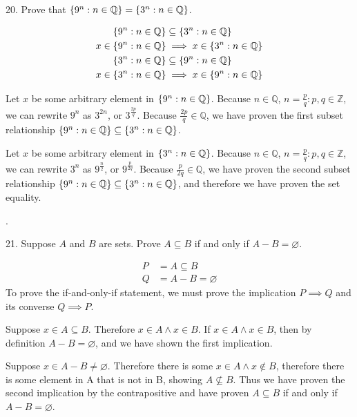 \documentclass{idrisMemo}
\begin{document}
\begin{prooflist}{20. Prove that $\{9^n: n \in \mathbb{Q}\}=\{3^n: n \in
    \mathbb{Q}\}$.}
\item
\begin{align*}
    \{9^n: n \in \mathbb{Q}\} &\subseteq\{3^n: n \in \mathbb{Q}\}\\
    x\in \{9^n: n \in \mathbb{Q}\} &\implies x\in\{3^n: n \in \mathbb{Q}\}\\
    \{3^n: n \in \mathbb{Q}\}
    &\subseteq
    \{9^n: n \in \mathbb{Q}\}\\
    x\in\{3^n: n \in \mathbb{Q}\}
    &\implies
    x\in \{9^n: n \in \mathbb{Q}\}
\end{align*}
\item Let $x$ be some arbitrary element in $\{9^n: n \in \mathbb{Q}\}$.
    Because $n\in\mathbb{Q}$, $n=\frac{p}{q}: p,q\in\mathbb{Z}$,
    we can rewrite $9^n$ as $3^{2n}$, or $3^{\frac{2p}{q}}$. Because
    $\frac{2p}{q} \in \mathbb{Q}$, we have proven the first subset
    relationship $\{9^n: n \in \mathbb{Q}\} \subseteq\{3^n: n \in
    \mathbb{Q}\}$.
\item Let $x$ be some arbitrary element in $\{3^n: n \in \mathbb{Q}\}$.
    Because $n\in\mathbb{Q}$, $n=\frac{p}{q}: p,q\in\mathbb{Z}$,
    we can rewrite $3^n$ as $9^{\frac{n}{2}}$, or $9^{\frac{p}{2q}}$. Because
    $\frac{p}{2q} \in \mathbb{Q}$, we have proven the second subset
    relationship $\{9^n: n \in \mathbb{Q}\} \subseteq\{3^n: n \in
    \mathbb{Q}\}$, and therefore we have proven the set equality.
\end{prooflist}.

\begin{prooflist}{21. Suppose $A$ and $B$ are sets. Prove $A \subseteq B$ if and only if $A-B=\varnothing$.}
\item
    \begin{align*}
        P &= A \subseteq B\\
        Q &= A - B = \varnothing
\end{align*}
To prove the if-and-only-if statement, we must prove the implication $P\implies
Q$ and its converse $Q\implies P$.
\item Suppose $x\in A\subseteq B$. Therefore $x\in A \land x \in B$. If $x\in
    A\land x\in B$, then by definition $A-B=\varnothing$, and we have shown the
    first implication.
\item Suppose $x\in A-B\neq\varnothing$. Therefore there is some $x\in A\land
    x\notin B$, therefore there is some element in A that is not in B, showing
    $A\not\subseteq B$. Thus we have proven the second implication by the
    contrapositive and have proven $A \subseteq B$ if and only if
    $A-B=\varnothing$.
\end{prooflist}
\end{document}
